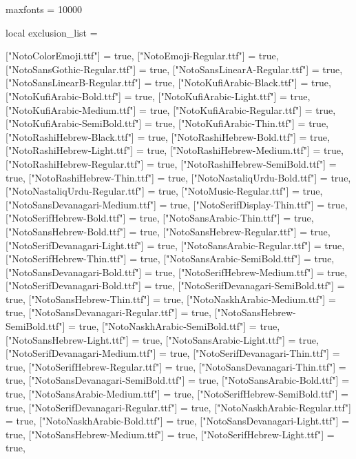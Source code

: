 \documentclass{article}
\begin{document}
\begin{luacode*}
  maxfonts = 10000

  local exclusion_list = {
    ["NotoColorEmoji.ttf"] = true,
    ["NotoEmoji-Regular.ttf"] = true,
    ["NotoSansGothic-Regular.ttf"] = true,
    ["NotoSansLinearA-Regular.ttf"] = true,
    ["NotoSansLinearB-Regular.ttf"] = true,
    ["NotoKufiArabic-Black.ttf"] = true,
    ["NotoKufiArabic-Bold.ttf"] = true,
    ["NotoKufiArabic-Light.ttf"] = true,
    ["NotoKufiArabic-Medium.ttf"] = true,
    ["NotoKufiArabic-Regular.ttf"] = true,
    ["NotoKufiArabic-SemiBold.ttf"] = true,
    ["NotoKufiArabic-Thin.ttf"] = true,
    ["NotoRashiHebrew-Black.ttf"] = true,
    ["NotoRashiHebrew-Bold.ttf"] = true,
    ["NotoRashiHebrew-Light.ttf"] = true,
    ["NotoRashiHebrew-Medium.ttf"] = true,
    ["NotoRashiHebrew-Regular.ttf"] = true,
    ["NotoRashiHebrew-SemiBold.ttf"] = true,
    ["NotoRashiHebrew-Thin.ttf"] = true,
    ["NotoNastaliqUrdu-Bold.ttf"] = true,
    ["NotoNastaliqUrdu-Regular.ttf"] = true,
    ["NotoMusic-Regular.ttf"] = true,
    ["NotoSansDevanagari-Medium.ttf"] = true,
    ["NotoSerifDisplay-Thin.ttf"] = true,
    ["NotoSerifHebrew-Bold.ttf"] = true,
    ["NotoSansArabic-Thin.ttf"] = true,
    ["NotoSansHebrew-Bold.ttf"] = true,
    ["NotoSansHebrew-Regular.ttf"] = true,
    ["NotoSerifDevanagari-Light.ttf"] = true,
    ["NotoSansArabic-Regular.ttf"] = true,
    ["NotoSerifHebrew-Thin.ttf"] = true,
    ["NotoSansArabic-SemiBold.ttf"] = true,
    ["NotoSansDevanagari-Bold.ttf"] = true,
    ["NotoSerifHebrew-Medium.ttf"] = true,
    ["NotoSerifDevanagari-Bold.ttf"] = true,
    ["NotoSerifDevanagari-SemiBold.ttf"] = true,
    ["NotoSansHebrew-Thin.ttf"] = true,
    ["NotoNaskhArabic-Medium.ttf"] = true,
    ["NotoSansDevanagari-Regular.ttf"] = true,
    ["NotoSansHebrew-SemiBold.ttf"] = true,
    ["NotoNaskhArabic-SemiBold.ttf"] = true,
    ["NotoSansHebrew-Light.ttf"] = true,
    ["NotoSansArabic-Light.ttf"] = true,
    ["NotoSerifDevanagari-Medium.ttf"] = true,
    ["NotoSerifDevanagari-Thin.ttf"] = true,
    ["NotoSerifHebrew-Regular.ttf"] = true,
    ["NotoSansDevanagari-Thin.ttf"] = true,
    ["NotoSansDevanagari-SemiBold.ttf"] = true,
    ["NotoSansArabic-Bold.ttf"] = true,
    ["NotoSansArabic-Medium.ttf"] = true,
    ["NotoSerifHebrew-SemiBold.ttf"] = true,
    ["NotoSerifDevanagari-Regular.ttf"] = true,
    ["NotoNaskhArabic-Regular.ttf"] = true,
    ["NotoNaskhArabic-Bold.ttf"] = true,
    ["NotoSansDevanagari-Light.ttf"] = true,
    ["NotoSansHebrew-Medium.ttf"] = true,
    ["NotoSerifHebrew-Light.ttf"] = true,

}
\end{luacode*}
\end{document}
